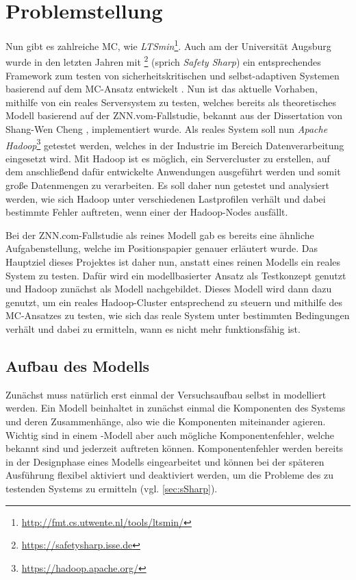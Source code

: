 \section{Problemstellung}\label{sec:problemstellung}

Nun gibt es zahlreiche \ac{MC}, wie \zB \emph{LTSmin}\footnote{\url{http://fmt.cs.utwente.nl/tools/ltsmin/}}. Auch am \isse der Universität Augsburg wurde in den letzten Jahren mit \sS\footnote{\url{https://safetysharp.isse.de}} (sprich \emph{Safety Sharp}) ein entsprechendes Framework zum testen von sicherheitskritischen und selbst-adaptiven Systemen basierend auf dem \ac{MC}-Ansatz entwickelt \cite{Habermaier2015,Habermaier2016}. Nun ist das aktuelle Vorhaben, mithilfe von \sS ein reales Serversystem zu testen, welches bereits als theoretisches Modell basierend auf der ZNN.vom-Fallstudie, bekannt aus der Dissertation von Shang-Wen Cheng \cite{Cheng2008}, implementiert wurde. Als reales System soll nun \emph{Apache Hadoop}\footnote{\url{https://hadoop.apache.org/}} getestet werden, welches in der Industrie im Bereich Datenverarbeitung eingesetzt wird. Mit Hadoop ist es möglich, ein Servercluster zu erstellen, auf dem anschließend dafür entwickelte Anwendungen ausgeführt werden und somit große Datenmengen zu verarbeiten. Es soll daher nun getestet und analysiert werden, wie sich Hadoop unter verschiedenen Lastprofilen verhält und dabei bestimmte Fehler auftreten, wenn \zB einer der Hadoop-Nodes ausfällt.

Bei der ZNN.com-Fallstudie als reines Modell gab es bereits eine ähnliche Aufgabenstellung, welche im Positionspapier \cite{Eberhardinger2017} genauer erläutert wurde. Das Hauptziel dieses Projektes ist daher nun, anstatt eines reinen Modells ein reales System zu testen. Dafür wird ein modellbasierter Ansatz als Testkonzept genutzt und Hadoop zunächst als Modell nachgebildet. Dieses Modell wird dann dazu genutzt, um ein reales Hadoop-Cluster entsprechend zu steuern und mithilfe des \ac{MC}-Ansatzes zu testen, wie sich das reale System unter bestimmten Bedingungen verhält und dabei zu ermitteln, wann es nicht mehr funktionsfähig ist.

\subsection{Aufbau des Modells}\label{sec:modellaufbau}

Zunächst muss natürlich erst einmal der Versuchsaufbau selbst in \sS modelliert werden. Ein Modell beinhaltet in \sS zunächst einmal die Komponenten des Systems und deren Zusammenhänge, also wie die Komponenten miteinander agieren. Wichtig sind in einem \sS-Modell aber auch mögliche Komponentenfehler, welche bekannt sind und jederzeit auftreten können. Komponentenfehler werden bereits in der Designphase eines Modells eingearbeitet und können bei der späteren Ausführung flexibel aktiviert und deaktiviert werden, um die Probleme des zu testenden Systems zu ermitteln (vgl. \autoref{sec:sSharp}).


